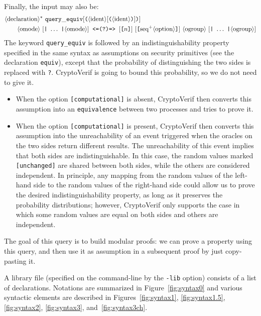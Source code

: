 Finally, the input may also be:
\begin{align*}
&\nonterm{declaration}^*\ {\tt query\_equiv}[\texttt{(}\nonterm{ident}[\texttt{(}\nonterm{ident}\texttt{)}]\texttt{)}]\\
&\qquad \nonterm{omode}\ [\texttt{|}\ \ldots\ \texttt{|}\nonterm{omode}]\texttt{ <=(?)=> }
[\texttt{[}n\texttt{]}]\ [\texttt{[}\neseq{option}\texttt{]}]\ \nonterm{ogroup}\ [\texttt{|}\ \ldots\ \texttt{|}\nonterm{ogroup}]
\end{align*}
The keyword {\tt query\_equiv} is followed by an indistinguishability property
specified in the same syntax as assumptions on security primitives
(see the declaration \texttt{equiv}), except that the probability of
distinguishing the two sides is replaced with \texttt{?}. CryptoVerif
is going to bound this probability, so we do not need to give it.
\begin{itemize}

\item When the option \texttt{[computational]} is absent,
CryptoVerif then converts this assumption
into an \texttt{equivalence} between two processes
and tries to prove it.

\item When the option \texttt{[computational]} is present,
CryptoVerif then converts this assumption into the unreachability of
an event triggered when the oracles on the two sides return different
results. The unreachability of this event implies that both sides are
indistinguishable.  In this case, the random values
marked \texttt{[unchanged]} are shared between both sides, while the
others are considered independent. In principle, any mapping from the
random values of the left-hand side to the random values of the
right-hand side could allow us to prove the desired
indistinguishability property, as long as it preserves the probability
distributions; however, CryptoVerif only supports the case in which
some random values are equal on both sides and others are independent.

\end{itemize}
The goal of this query is to build modular proofs: we can prove
a property using this query, and then use it as assumption
in a subsequent proof by just copy-pasting it.

A library file (specified on the command-line by the
{\tt -lib} option) consists of a list of declarations.
Notations are summarized in Figure~\ref{fig:syntax0}
and various syntactic elements are described in 
Figures~\ref{fig:syntax1}, \ref{fig:syntax1.5}, \ref{fig:syntax2}, \ref{fig:syntax3},
and~\ref{fig:syntax3ch}.

